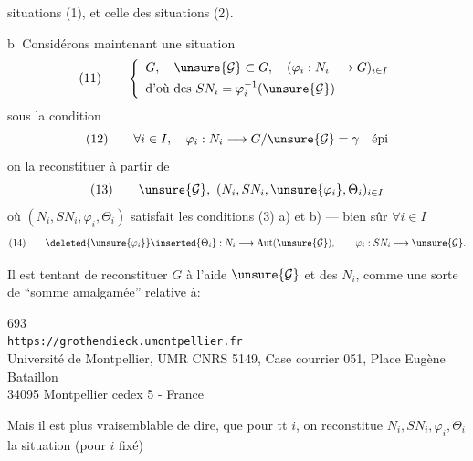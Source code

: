 
situations (1), et celle des situations (2).

\textcircled{b}
Considérons maintenant une situation
\[
(11)\qquad 
\left\{\begin{array}{l}
G,\quad \unsure{\mathcal G}\subset G,\quad (\varphi_i:N_i\longrightarrow G)_{i\in I}\\[4pt]
\text{d'où des }SN_i=\varphi_i^{-1}(\unsure{\mathcal G})
\end{array}\right.
\]
sous la condition
\[
(12)\qquad 
\forall i\in I,\quad \varphi_i:N_i\longrightarrow G/\unsure{\mathcal G}=\gamma\quad\text{épi}
\]
 on la reconstituer à partir de
\[
(13)\qquad 
\unsure{\mathcal G},\ (N_i,SN_i,\unsure{\varphi_i},\Theta_i)_{i\in I}
\]
où  $(N_i,SN_i,\varphi_i,\Theta_i)$ satisfait les conditions (3) a) et b) ---  bien sûr $\forall i\in I$
\[
(14)\qquad 
\deleted{\unsure{\varphi_i}}\inserted{\Theta_i}:N_i\longrightarrow\operatorname{Aut}(\unsure{\mathcal G}),\qquad
\varphi_i:SN_i\longrightarrow\unsure{\mathcal G}.
\]

Il est tentant de reconstituer $G$ à l'aide  $\unsure{\mathcal G}$ et des $N_i$, comme une sorte de ``somme amalgamée'' relative à:

\noindent {}\quad
{}


\begin{center}
693\\
\texttt{https://grothendieck.umontpellier.fr}\\
Université de Montpellier, UMR CNRS 5149, Case courrier 051, Place Eugène Bataillon\\
34095 Montpellier cedex 5 - France
\end{center}




Mais il est plus vraisemblable de dire, que pour tt $i$, on reconstitue  $N_i,SN_i,\varphi_i,\Theta_i$ la situation (pour $i$ fixé)

